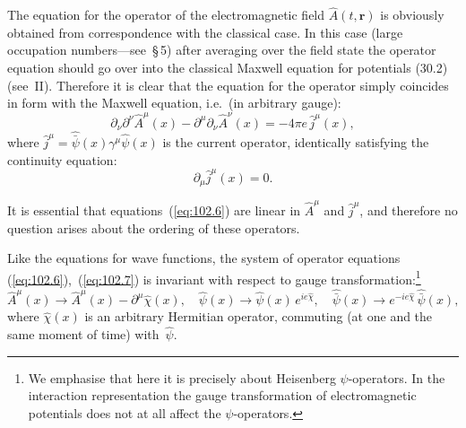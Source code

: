 The equation for the operator of the electromagnetic field $\hat{A}(t, \mathbf{r})$ is obviously obtained from correspondence with the classical case. In this case (large occupation numbers---see~\S\,5) after averaging over the field state the operator equation should go over into the classical Maxwell equation for potentials (30.2) (see~II). Therefore it is clear that the equation for the operator simply coincides in form with the Maxwell equation, i.e.\ (in arbitrary gauge):
\begin{equation}
\partial_\nu \partial^\nu \hat{A}^\mu(x) - \partial^\mu \partial_\nu \hat{A}^\nu(x) = -4\pi e\,\hat{j}^\mu(x),
\label{eq:102.6}
\end{equation}
where $\hat{j}^\mu = \hat{\bar{\psi}}(x)\gamma^\mu\hat{\psi}(x)$ is the current operator, identically satisfying the continuity equation:
\begin{equation}
\partial_\mu \hat{j}^\mu(x) = 0.
\label{eq:102.7}
\end{equation}


It is essential that equations~(\ref{eq:102.6}) are linear in $\hat{A}^\mu$ and $\hat{j}^\mu$, and therefore no question arises about the ordering of these operators.

Like the equations for wave functions, the system of operator equations (\ref{eq:102.6}),~(\ref{eq:102.7}) is invariant with respect to gauge transformation:\footnote{We emphasise that here it is precisely about Heisenberg $\psi$-operators. In the interaction representation the gauge transformation of electromagnetic potentials does not at all affect the $\psi$-operators.}
\begin{equation}
\hat{A}^\mu(x) \to \hat{A}^\mu(x) - \partial^\mu\hat{\chi}(x), \quad \hat{\psi}(x) \to \hat{\psi}(x)\,e^{ie\hat{\chi}}, \quad \hat{\bar{\psi}}(x) \to e^{-ie\hat{\chi}}\,\hat{\bar{\psi}}(x),
\label{eq:102.8}
\end{equation}
where $\hat{\chi}(x)$ is an arbitrary Hermitian operator, commuting (at one and the same moment of time) with~$\hat{\psi}$.

